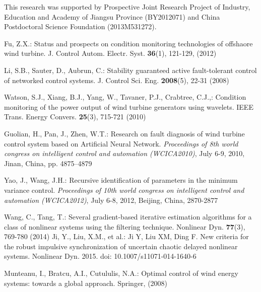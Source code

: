\begin{acknowledgements}

This research was supported by Prospective Joint Research Project of Industry,
Education and Academy of Jiangsu Province (BY2012071) and China Postdoctoral
Science Foundation (2013M531272).

\end{acknowledgements}



\clearpage
\begin{thebibliography}{99}

Fu, Z.X.: Status and prospects on condition monitoring technologies of offshaore wind turbine. J. Control Autom. Electr. Syst. \textbf{36}(1), 121-129, (2012)


Li, S.B., Sauter, D., Aubrun, C.: Stability guaranteed active fault-tolerant control of networked control systems. J. Control Sci. Eng. \textbf{2008}(5), 22-31 (2008)

Watson, S.J., Xiang, B.J., Yang, W., Tavaner, P.J., Crabtree, C.J.,: Condition monitoring of the power output of wind turbine generators using wavelets. IEEE Trans. Energy Convers. \textbf{25}(3), 715-721 (2010)

Guolian, H., Pan, J., Zhen, W.T.: Research on fault diagnosis of wind turbine control system based on Artificial Neural Network. \emph{Proceedings of 8th world congress on intelligent control and automation (WCICA2010)}, July 6-9, 2010, Jinan, China, pp. 4875--4879

Yao, J., Wang, J.H.: Recursive identification of parameters in the minimum variance control. \emph{Proceedings of 10th world congress on intelligent control and automation (WCICA2012)}, July 6-8, 2012, Beijing, China, 2870-2877

 Wang, C., Tang, T.: Several gradient-based iterative estimation algorithms for a class of nonlinear systems using the filtering technique. Nonlinear Dyn. {\bf 77}(3), 769-780 (2014)
Ji, Y., Liu, X.M., et al.:  Ji Y, Liu XM, Ding F. New criteria for the robust impulsive synchronization of uncertain chaotic delayed nonlinear systems. Nonlinear Dyn. 2015. doi: 10.1007/s11071-014-1640-6



Munteanu, I., Bratcu, A.I., Cutululis, N.A.: Optimal control of wind energy systems: towards a global approach. Springer, (2008)



\end{thebibliography}
